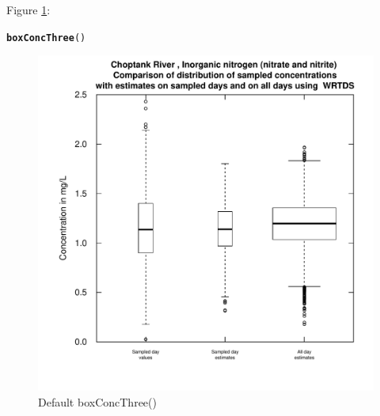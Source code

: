 \documentclass[a4paper,11pt]{article}\usepackage[]{graphicx}\usepackage[]{color}
\makeatletter
\newcommand{\hlstd}[1]{\textcolor[rgb]{0.345,0.345,0.345}{#1}}%
\newcommand{\hlkwd}[1]{\textcolor[rgb]{0.737,0.353,0.396}{\textbf{#1}}}%
\newenvironment{kframe}{%
 \def\at@end@of@kframe{}%
 \ifinner\ifhmode%
  \def\at@end@of@kframe{\end{minipage}}%
  \begin{minipage}{\columnwidth}%
 \fi\fi%
 \def\FrameCommand##1{\hskip\@totalleftmargin \hskip-\fboxsep
 \colorbox{shadecolor}{##1}\hskip-\fboxsep
     \hskip-\linewidth \hskip-\@totalleftmargin \hskip\columnwidth}%
 \MakeFramed {\advance\hsize-\width
   \@totalleftmargin\z@ \linewidth\hsize
   \@setminipage}}%
 {\par\unskip\endMakeFramed%
 \at@end@of@kframe}
\newenvironment{knitrout}{}{} %
\makeatother
\begin{document}
Figure \ref{fig:boxConcThree}:
\begin{knitrout}
\color{fgcolor}\begin{kframe}
\begin{alltt}
\hlkwd{boxConcThree}\hlstd{()}
\end{alltt}
\end{kframe}\begin{figure}[]

\includegraphics[width=.5\linewidth,height=.5\linewidth]{figure/boxConcThree} \caption[Default boxConcThree()]{Default boxConcThree()\label{fig:boxConcThree}}
\end{figure}


\end{knitrout}
\end{document}
